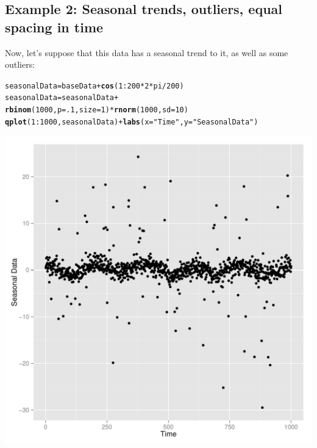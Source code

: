 \documentclass[nojss]{jss}\usepackage[]{graphicx}\usepackage[]{color}
\makeatletter
\def\maxwidth{ %
  \ifdim\Gin@nat@width>\linewidth
    \linewidth
  \else
    \Gin@nat@width
  \fi
}
\newcommand{\hlnum}[1]{\textcolor[rgb]{0.686,0.059,0.569}{#1}}%
\newcommand{\hlstr}[1]{\textcolor[rgb]{0.192,0.494,0.8}{#1}}%
\newcommand{\hlopt}[1]{\textcolor[rgb]{0,0,0}{#1}}%
\newcommand{\hlstd}[1]{\textcolor[rgb]{0.345,0.345,0.345}{#1}}%
\newcommand{\hlkwb}[1]{\textcolor[rgb]{0.69,0.353,0.396}{#1}}%
\newcommand{\hlkwc}[1]{\textcolor[rgb]{0.333,0.667,0.333}{#1}}%
\newcommand{\hlkwd}[1]{\textcolor[rgb]{0.737,0.353,0.396}{\textbf{#1}}}%
\newenvironment{kframe}{%
 \def\at@end@of@kframe{}%
 \ifinner\ifhmode%
  \def\at@end@of@kframe{\end{minipage}}%
  \begin{minipage}{\columnwidth}%
 \fi\fi%
 \def\FrameCommand##1{\hskip\@totalleftmargin \hskip-\fboxsep
 \colorbox{shadecolor}{##1}\hskip-\fboxsep
     \hskip-\linewidth \hskip-\@totalleftmargin \hskip\columnwidth}%
 \MakeFramed {\advance\hsize-\width
   \@totalleftmargin\z@ \linewidth\hsize
   \@setminipage}}%
 {\par\unskip\endMakeFramed%
 \at@end@of@kframe}
\newenvironment{knitrout}{}{} %
\makeatother
\begin{document}
\begin{knitrout}
{}



\end{knitrout}

\subsection{Example 2: Seasonal trends, outliers, equal spacing in time}

Now, let's suppose that this data has a seasonal trend to it, as well as some outliers:

\begin{knitrout}
\color{fgcolor}\begin{kframe}
\begin{alltt}
\hlstd{seasonalData} \hlkwb{=} \hlstd{baseData} \hlopt{+} \hlkwd{cos}\hlstd{(}\hlnum{1}\hlopt{:}\hlnum{200} \hlopt{*} \hlnum{2} \hlopt{*} \hlstd{pi} \hlopt{/} \hlnum{200}\hlstd{)}
\hlstd{seasonalData} \hlkwb{=} \hlstd{seasonalData} \hlopt{+}
    \hlkwd{rbinom}\hlstd{(}\hlnum{1000}\hlstd{,} \hlkwc{p} \hlstd{=} \hlnum{.1}\hlstd{,} \hlkwc{size} \hlstd{=} \hlnum{1}\hlstd{)} \hlopt{*} \hlkwd{rnorm}\hlstd{(}\hlnum{1000}\hlstd{,} \hlkwc{sd} \hlstd{=} \hlnum{10}\hlstd{)}
\hlkwd{qplot}\hlstd{(}\hlnum{1}\hlopt{:}\hlnum{1000}\hlstd{, seasonalData)} \hlopt{+} \hlkwd{labs}\hlstd{(}\hlkwc{x} \hlstd{=} \hlstr{"Time"}\hlstd{,} \hlkwc{y} \hlstd{=} \hlstr{"Seasonal Data"}\hlstd{)}
\end{alltt}
\end{kframe}

{\centering \includegraphics[width=\maxwidth]{figure/unnamed-chunk-7-1} 

}



\end{knitrout}
\end{document}
